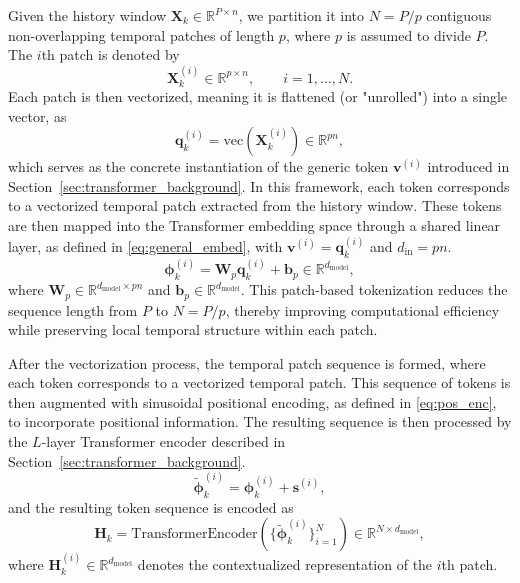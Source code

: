 \documentclass[journal]{IEEEtran}
\newcommand{\vs}{\mathbf{s}}
\newcommand{\vb}{\mathbf{b}}
\newcommand{\vphi}{\boldsymbol{\phi}}
\newcommand{\vq}{\mathbf{q}}
\newcommand{\mW}{\mathbf{W}}
\newcommand{\mX}{\mathbf{X}}
\newcommand{\mH}{\mathbf{H}}
\begin{document}
Given the history window $\mX_k \in \mathbb{R}^{P \times n}$, we partition it into $N = P/p$ contiguous non-overlapping temporal patches of length $p$, where $p$ is assumed to divide $P$. The $i$th patch is denoted by
\begin{equation}
    \mX_k^{(i)} \in \mathbb{R}^{p \times n}, \qquad i=1,\ldots,N.
\end{equation}
Each patch is then vectorized, meaning it is flattened (or "unrolled") into a single vector, as
\begin{equation}
    \vq_k^{(i)} = \mathrm{vec}(\mX_k^{(i)}) \in \mathbb{R}^{pn},
    \label{eq:patch_vec}
\end{equation}
which serves as the concrete instantiation of the generic token $\mathbf{v}^{(i)}$ introduced in Section~\ref{sec:transformer_background}. In this framework, each token corresponds to a vectorized temporal patch extracted from the history window. These tokens are then mapped into the Transformer embedding space through a shared linear layer, as defined in \eqref{eq:general_embed}, with $\mathbf{v}^{(i)} = \vq_k^{(i)}$ and $d_{\mathrm{in}} = pn$.
\begin{equation}
    \vphi_k^{(i)} = \mW_p \vq_k^{(i)} + \vb_p
    \in \mathbb{R}^{d_{\mathrm{model}}},
    \label{eq:patch_embedding}
\end{equation}
where $\mW_p \in \mathbb{R}^{d_{\mathrm{model}} \times pn}$ and
$\vb_p \in \mathbb{R}^{d_{\mathrm{model}}}$. This patch-based
tokenization reduces the sequence length from $P$ to $N=P/p$, thereby
improving computational efficiency while preserving local temporal
structure within each patch.

After the vectorization process, the temporal patch sequence is formed, where each token corresponds to a vectorized temporal patch. This sequence of tokens is then augmented with sinusoidal positional encoding, as defined in \eqref{eq:pos_enc}, to incorporate positional information. The resulting sequence is then processed by the $L$-layer Transformer encoder described in Section~\ref{sec:transformer_background}. 
\begin{equation}
    \tilde{\vphi}_k^{(i)} = \vphi_k^{(i)} + \vs^{(i)},
    \label{eq:pos_enc_applied}
\end{equation}
and the resulting token sequence is encoded as
\begin{equation}
    \mH_k = \mathrm{TransformerEncoder}\!\left(
        \{\tilde{\vphi}_k^{(i)}\}_{i=1}^{N}
    \right) \in \mathbb{R}^{N \times d_{\mathrm{model}}},
    \label{eq:transformer_enc}
\end{equation}
where $\mH_k^{(i)} \in \mathbb{R}^{d_{\mathrm{model}}}$ denotes the
contextualized representation of the $i$th patch.
\end{document}
